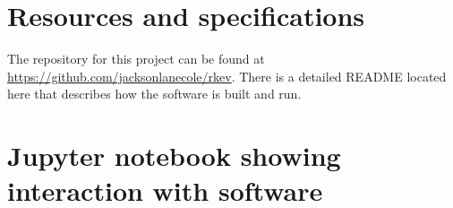 \documentclass[onecolumn,titlepage,letterpaper,10pt]{article}
\newcommand{\functionof}[2]{#1\left(#2\right)}
\begin{document}

%
\begin{appendices}
    \section{Resources and specifications}
    The repository for this project can be found at
    \url{https://github.com/jacksonlanecole/rkev}. There is a detailed README
    located here that describes how the software is built and run.

    \section{Jupyter notebook showing interaction with software}\label{app:jupyter}
    
\end{appendices}

\clearpage

%
%
%
\end{document}
